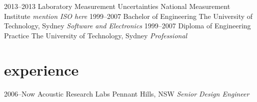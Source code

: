 \documentclass[]{friggeri-cv} %
\begin{document}
\begin{entrylist}
    \entry
    {2013--2013}
    {Laboratory {\normalfont{} Measurement Uncertainties}}
    {National Measurement Institute}
    {\emph{mention ISO here}}
    \entry
    {1999--2007}
    {Bachelor {\normalfont{} of Engineering}}
    {The University of Technology, Sydney}
    {\emph{Software and Electronics}}
    \entry
    {1999--2007}
    {Diploma {\normalfont{} of Engineering Practice}}
    {The University of Technology, Sydney}
    {\emph{Professional}}
\end{entrylist}

\section{experience}

\begin{entrylist}
    \entry
    {2006--Now}
    {Acoustic Research Labs}
    {Pennant Hills, NSW}
    {\emph{Senior Design Engineer}}
\end{entrylist}
\end{document}
